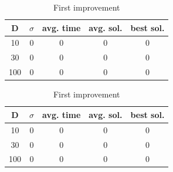 \documentclass{article}
\begin{document}
\begin{table}[htbp]
\begin{minipage}{.4\linewidth}
    \centering

    \begin{tabular}{|c|c|c|c|c|}
    \hline
    D   & $\sigma$  & avg. time     & avg. sol.     & best sol. \\
    \hline
    10  & 0         & 0             & 0             & 0 \\
    \hline
    30  & 0         & 0             & 0             & 0 \\
    \hline
    100 & 0         & 0             & 0             & 0 \\
    \hline
    \end{tabular}
    \caption{Best improvement}
  \end{minipage}%
  \quad %
  \begin{minipage}{.75\linewidth}
    \centering

    \begin{tabular}{|c|c|c|c|c|}
    \hline
    D   & $\sigma$  & avg. time     & avg. sol.     & best sol. \\
    \hline
    10  & 0         & 0             & 0             & 0 \\
    \hline
    30  & 0         & 0             & 0             & 0 \\
    \hline
    100 & 0         & 0             & 0             & 0 \\
    \hline
    \end{tabular}
    \caption{First improvement}
  \end{minipage}
\end{table}
\end{document}
